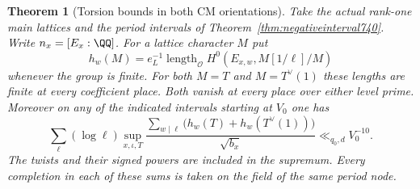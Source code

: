 \documentclass[a4paper,11pt]{article}
\newtheorem{theorem}[proposition]{Theorem}
\theoremstyle{definition}
\theoremstyle{remark}
\numberwithin{equation}{section}
\begin{document}
\begin{theorem}[Torsion bounds in both CM orientations]
\leavevmode\label{thm:alltorsion741}
Take the actual rank-one main lattices and the period intervals
of Theorem~\ref{thm:negativeinterval740}. Write \(n_x=[E_x:\QQ]\).
For a lattice character \(M\) put
\[
 h_w(M)=e_L^{-1}\operatorname{length}_{\mathcal O}
              H^0(E_{x,w},M[1/\ell]/M)
\]
whenever the group is finite. For both \(M=T\) and
\(M=T^\vee(1)\) these lengths are finite at every coefficient
place. Both vanish at every place over either level prime.
Moreover on any of the indicated intervals starting at \(V_0\)
one has
\[
 \sum_\ell(\log\ell)\sup_{x,\iota,T}
 \frac{\displaystyle\sum_{w\mid\ell}\bigl(h_w(T)+h_w(T^\vee(1))\bigr)}
      {\sqrt{b_x}}\ll_{q_0,d}V_0^{-10}.
 \tag{9}\label{eq:alltorsion741}
\]
The twists and their signed powers are included in the
supremum. Every completion in each of these sums is taken on
the field of the same period node.
\end{theorem}
\end{document}
